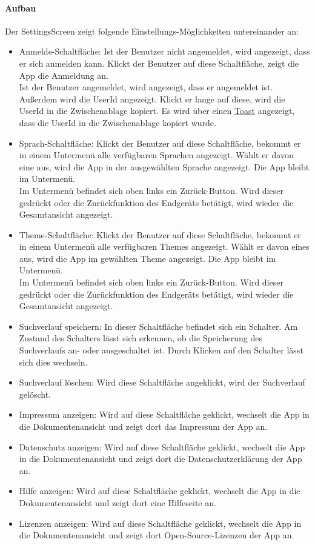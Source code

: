 \paragraph*{Aufbau}
Der SettingsScreen zeigt folgende Einstellungs-Möglichkeiten untereinander an:
\begin{itemize}
    \item Anmelde-Schaltfläche: Ist der Benutzer nicht angemeldet, wird angezeigt, dass er sich anmelden kann. 
    Klickt der Benutzer auf diese Schaltfläche, zeigt die App die Anmeldung an.\\
    Ist der Benutzer angemeldet, wird angezeigt, dass er angemeldet ist. Außerdem wird die UserId angezeigt. 
    Klickt er lange auf diese, wird die UserId in die Zwischenablage kopiert. 
    Es wird über einen \href{https://developer.android.com/guide/topics/ui/notifiers/toasts}{Toast} angezeigt, dass 
    die UserId in die Zwischenablage kopiert wurde.
    \item Sprach-Schaltfläche: Klickt der Benutzer auf diese Schaltfläche, bekommt er in einem Untermenü alle verfügbaren Sprachen angezeigt. 
    Wählt er davon eine aus, wird die App in der ausgewählten Sprache angezeigt. Die App bleibt im Untermenü.\\
    Im Untermenü befindet sich oben links ein Zurück-Button. Wird dieser gedrückt oder die Zurückfunktion des Endgeräts betätigt, 
    wird wieder die Gesamtansicht angezeigt.
    \item Theme-Schaltfläche: Klickt der Benutzer auf diese Schaltfläche, bekommt er in einem Untermenü alle verfügbaren Themes angezeigt. 
    Wählt er davon eines aus, wird die App im gewählten Theme angezeigt. Die App bleibt im Untermenü.\\
    Im Untermenü befindet sich oben links ein Zurück-Button. Wird dieser gedrückt oder die Zurückfunktion des Endgeräts betätigt, 
    wird wieder die Gesamtansicht angezeigt.
    \item Suchverlauf speichern: In dieser Schaltfläche befindet sich ein Schalter. 
    Am Zustand des Schalters lässt sich erkennen, ob die Speicherung des Suchverlaufs an- oder ausgeschaltet ist. 
    Durch Klicken auf den Schalter lässt sich dies wechseln.
    \item Suchverlauf löschen: Wird diese Schaltfläche angeklickt, wird der Suchverlauf gelöscht.
    \item Impressum anzeigen: Wird auf diese Schaltfläche geklickt, wechselt die App in die Dokumentenansicht und zeigt dort das Impressum der App an.
    \item Datenschutz anzeigen: Wird auf diese Schaltfläche geklickt, wechselt die App in die Dokumentenansicht und zeigt dort die Datenschutzerklärung der App an.
    \item Hilfe anzeigen: Wird auf diese Schaltfläche geklickt, wechselt die App in die Dokumentenansicht und zeigt dort eine Hilfeseite an.
    \item Lizenzen anzeigen: Wird auf diese Schaltfläche geklickt, wechselt die App in die Dokumentenansicht und zeigt dort Open-Source-Lizenzen der App an.
\end{itemize}

